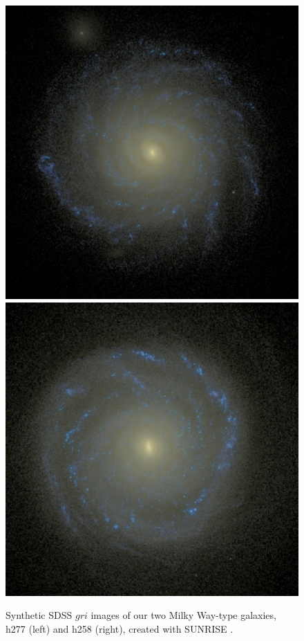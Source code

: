 \documentclass[nofootinbib,twocolumn,prd]{emulateapj}
\begin{document}
\begin{figure}
\includegraphics[width=\columnwidth]{Figures/boring}
\includegraphics[width=\columnwidth]{Figures/exciting}
\caption{\label{fig:GalaxyImages}Synthetic SDSS $gri$ images of our two Milky Way-type galaxies, h277 (left) and h258 (right), created with \textsc{SUNRISE} \citep{Jonsson06}.
\label{fig:images}
}
\end{figure}
\end{document}

